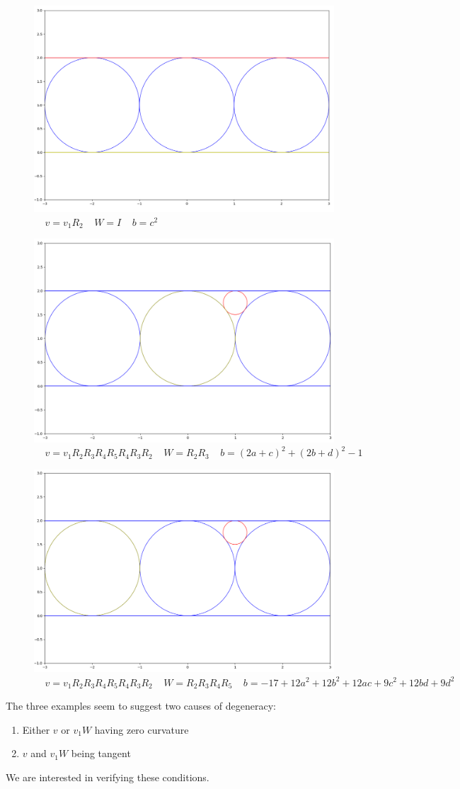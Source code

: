 \documentclass[]{article}
\begin{document}
\begin{figure}[h]
	\centering
	\includegraphics[width=0.8\linewidth]{simple_Ap.png}
	\caption{$ ~~~~~ v = v_1R_2 ~~~~~ W = I ~~~~~ b = c^2$}
	\label{simple}
\end{figure}
\begin{figure}[h]
	\centering
	\includegraphics[width=0.8\linewidth]{tangent_Ap.png}
	\caption{$ ~~~~~ v = v_1R_2R_3R_4R_5R_4R_3R_2 ~~~~~ W = R_2R_3 ~~~~~ b = (2a + c)^2 + (2b + d)^2 - 1$}
	\label{tangent}
\end{figure}
\begin{figure}[h]
	\centering
	\includegraphics[width=0.8\linewidth]{non_tangent_Ap.png}
	\caption{$ ~~~~~ v = v_1R_2R_3R_4R_5R_4R_3R_2 ~~~~~ W = R_2R_3R_4R_5 ~~~~~ b = -17 + 12a^2 + 12b^2 + 12ac + 9c^2 + 12bd + 9d^2$}
	\label{non_tangent}
\end{figure}

The three examples seem to suggest two causes of degeneracy:
\begin{enumerate}
	\item Either $v$ or $v_1W$ having zero curvature
	\item $v$ and $v_1W$ being tangent
\end{enumerate}
We are interested in verifying these conditions.
	
\end{document}
